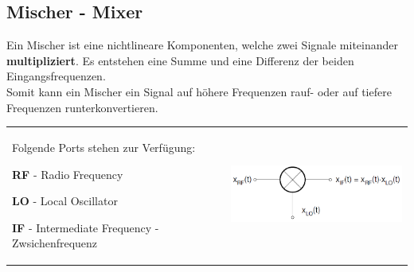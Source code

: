 \newpage
\subsection{Mischer - Mixer }
	Ein Mischer ist eine nichtlineare Komponenten, welche zwei Signale
    miteinander \textbf{multipliziert}. Es entstehen eine Summe und eine
    Differenz der beiden Eingangsfrequenzen. \\
    Somit kann ein Mischer ein Signal auf höhere Frequenzen rauf- oder auf
    tiefere Frequenzen runterkonvertieren. \\
    
\begin{tabular}{ll}
\parbox{9cm}{
    Folgende Ports stehen zur Verfügung:
    \begin{liste}
    	\item \textbf{RF} - Radio Frequency
    	\item \textbf{LO} - Local Oscillator
    	\item \textbf{IF} - Intermediate Frequency - Zwsichenfrequenz
    \end{liste}
    } & \parbox{9cm}{    
    \includegraphics[width=7cm]{./bilder/components_mixer_schematic.png} } \\
\end{tabular}

